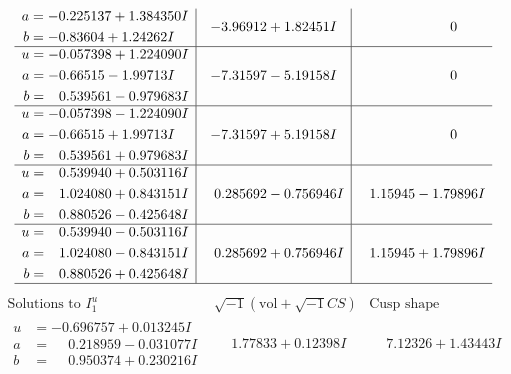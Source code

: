 \documentclass[1p]{elsarticle_modified}
\theoremstyle{definition}
\newcommand{\I}{\sqrt{-1}}
\begin{document}
$$\begin{array}{c|c|c}
\begin{aligned}
a &= -0.225137 + 1.384350 I \\
b &= -0.83604 + 1.24262 I\end{aligned}
 & -3.96912 + 1.82451 I & \phantom{-0.000000 } 0 \\ \hline\begin{aligned}
u &= -0.057398 + 1.224090 I \\
a &= -0.66515 - 1.99713 I \\
b &= \phantom{-}0.539561 - 0.979683 I\end{aligned}
 & -7.31597 - 5.19158 I & \phantom{-0.000000 } 0 \\ \hline\begin{aligned}
u &= -0.057398 - 1.224090 I \\
a &= -0.66515 + 1.99713 I \\
b &= \phantom{-}0.539561 + 0.979683 I\end{aligned}
 & -7.31597 + 5.19158 I & \phantom{-0.000000 } 0 \\ \hline\begin{aligned}
u &= \phantom{-}0.539940 + 0.503116 I \\
a &= \phantom{-}1.024080 + 0.843151 I \\
b &= \phantom{-}0.880526 - 0.425648 I\end{aligned}
 & \phantom{-}0.285692 - 0.756946 I & \phantom{-}1.15945 - 1.79896 I \\ \hline\begin{aligned}
u &= \phantom{-}0.539940 - 0.503116 I \\
a &= \phantom{-}1.024080 - 0.843151 I \\
b &= \phantom{-}0.880526 + 0.425648 I\end{aligned}
 & \phantom{-}0.285692 + 0.756946 I & \phantom{-}1.15945 + 1.79896 I\\
 \hline 
 \end{array}$$\newpage$$\begin{array}{c|c|c}  
\text{Solutions to }I^u_{1}& \I (\text{vol} + \sqrt{-1}CS) & \text{Cusp shape}\\
 \hline 
\begin{aligned}
u &= -0.696757 + 0.013245 I \\
a &= \phantom{-}0.218959 - 0.031077 I \\
b &= \phantom{-}0.950374 + 0.230216 I\end{aligned}
 & \phantom{-}1.77833 + 0.12398 I & \phantom{-}7.12326 + 1.43443 I \\ \hline\begin{aligned}

\end{aligned}
\end{array}$$
\end{document}
